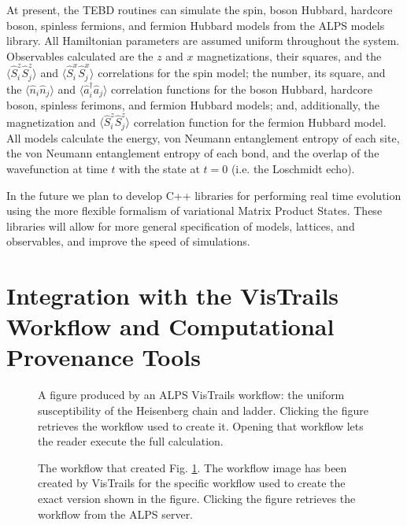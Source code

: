 \documentclass[12pt]{iopart}
\begin{document}
At present, the TEBD routines can simulate the spin, boson Hubbard, hardcore boson, spinless fermions, and fermion Hubbard models from the ALPS models library.  All 
Hamiltonian parameters are assumed uniform throughout the system.  Observables calculated are the $z$ and $x$ magnetizations, their squares, and the $\langle \hat{S}^z_i 
\hat{S}^z_j\rangle$ and $\langle \hat{S}^x_i \hat{S}^x_j\rangle$ correlations for the spin model; the number, its square, and the $\langle \hat{n}_i \hat{n}_j\rangle$ and 
$\langle \hat{a}_i^{\dagger} \hat{a}_j\rangle$ correlation functions for the boson Hubbard, hardcore boson, spinless ferimons, and fermion Hubbard models; and, additionally, 
the magnetization and $\langle \hat{S}^z_i \hat{S}^z_j\rangle$ correlation function for the fermion Hubbard model.  All models calculate the energy, von Neumann entanglement 
entropy of each site, the von Neumann entanglement entropy of each bond, and the overlap of the wavefunction at time $t$ with the state at $t=0$ (i.e. the Loschmidt echo).

In the future we plan to develop C++ libraries for performing real time evolution using the more flexible formalism of variational Matrix Product States.  These libraries will allow for more general specification of models, lattices, and observables, and improve the speed of simulations. 


\section{Integration with the VisTrails Workflow and Computational Provenance Tools}
\begin{figure}
\begin{center}

\caption{A figure produced by an ALPS VisTrails workflow: the uniform susceptibility of the Heisenberg chain and ladder. Clicking the figure retrieves the workflow used to 
create it. Opening that workflow lets the reader execute the full calculation.}
\label{fig:figure}
\end{center}
\end{figure}


\begin{figure}
\begin{center}
\caption{The workflow that created Fig. \ref{fig:figure}. The workflow image has been created by VisTrails for the specific workflow used to create the exact version shown in the figure. Clicking the figure retrieves the workflow from the ALPS server.}
\label{fig:workflow}
\end{center}
\end{figure}
\end{document}
